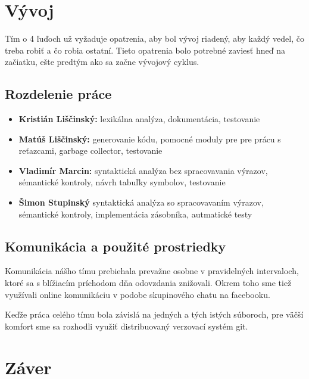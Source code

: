 \documentclass[11pt,a4paper]{article}
\begin{document}
	

\section{Vývoj}
Tím o 4 ľuďoch už vyžaduje opatrenia, aby bol vývoj riadený, aby každý vedel, čo treba robiť a
čo robia ostatní. Tieto opatrenia bolo potrebné zaviesť hneď na začiatku, ešte predtým ako sa
začne vývojový cyklus.

	\subsection{Rozdelenie práce}
		\begin{itemize}
		\item 	\textbf{Kristián Liščinský:} lexikálna analýza, dokumentácia, testovanie
		\item 	\textbf{Matúš Liščinský:} generovanie kódu, pomocné moduly pre pre prácu s reťazcami, garbage collector, testovanie 
		\item 	\textbf{Vladimír Marcin:} syntaktická analýza bez spracovavania výrazov, sémantické kontroly, návrh tabuľky symbolov, testovanie
		\item 	\textbf{Šimon Stupinský} syntaktická analýza so spracovavaním výrazov, sémantické kontroly, implementácia zásobníka, autmatické testy
		\end{itemize}

	\subsection{Komunikácia a použité prostriedky}
	Komunikácia nášho tímu prebiehala prevažne osobne v pravidelných intervaloch, ktoré sa s blížiacím príchodom dňa odovzdania znižovali. Okrem toho sme tiež využívali online komunikáciu v podobe skupinového chatu na facebooku.

	Keďže práca celého tímu bola závislá na jedných a tých istých súboroch, pre väčší komfort sme sa rozhodli využiť distribuovaný verzovací systém git.

\section{Záver}
\end{document}
